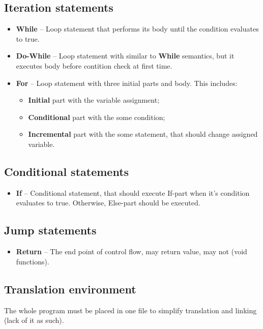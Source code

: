 \documentclass{article}
\begin{document}
		\subsection{Iteration statements}
			\begin{itemize}
		  		\item \textbf{While} -- Loop statement that performs its body until the
		  			condition evaluates to true.
		  		
		  		\item \textbf{Do-While} -- Loop statement with similar to \textbf{While}
		  			semantics, but it executes body before contition check at first time.
		  			
	  			\item \textbf{For} -- Loop statement with three initial parts and body.
	  				This includes:
	  				\begin{itemize}
	  					\item \textbf{Initial} part with the variable assignment;
	  					\item \textbf{Conditional} part with the some condition;
	  					\item \textbf{Incremental} part with the some statement, that
	  						should change assigned variable.
	  				\end{itemize}
			\end{itemize}
			
		\subsection{Conditional statements}
			\begin{itemize}
				\item \textbf{If} -- Conditional statement, that should execute
				If-part when it's condition evaluates to true. Otherwise, Else-part
				should be executed. 
			\end{itemize}
			
		\subsection{Jump statements}
			\begin{itemize}
				\item \textbf{Return} -- The end point of control flow, may return
				value, may not (void functions).
			\end{itemize}
			
		\subsection{Translation environment}
			The whole program must be placed in one file to simplify translation
			and linking (lack of it as such).
			
\end{document}
